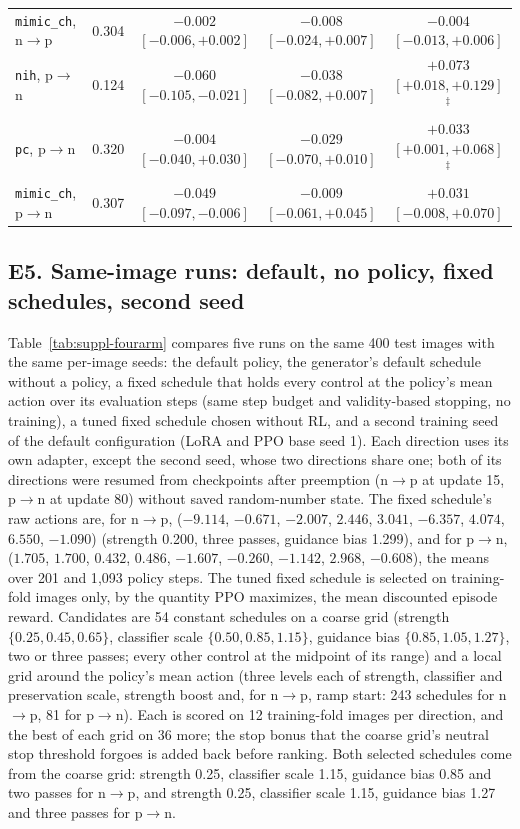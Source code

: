 \begin{table}[t]
\begin{tabular}{@{}lcccc@{}}
\texttt{mimic\_ch}, n$\to$p & 0.304 & $-0.002$ $[-0.006, +0.002]$ & $-0.008$ $[-0.024, +0.007]$ & $-0.004$ $[-0.013, +0.006]$ \\
\texttt{nih}, p$\to$n & 0.124 & $-0.060$ $[-0.105, -0.021]$ & $-0.038$ $[-0.082, +0.007]$ & $+0.073$ $[+0.018, +0.129]$$^{\ddagger}$ \\
\texttt{pc}, p$\to$n & 0.320 & $-0.004$ $[-0.040, +0.030]$ & $-0.029$ $[-0.070, +0.010]$ & $+0.033$ $[+0.001, +0.068]$$^{\ddagger}$ \\
\texttt{mimic\_ch}, p$\to$n & 0.307 & $-0.049$ $[-0.097, -0.006]$ & $-0.009$ $[-0.061, +0.045]$ & $+0.031$ $[-0.008, +0.070]$ \\
\bottomrule
\end{tabular}
\end{table}

\subsection*{E5. Same-image runs: default, no policy, fixed schedules, second seed}
\label{sec:suppl-fourarm}

Table~\ref{tab:suppl-fourarm} compares five runs on the same 400 test images with the same per-image seeds: the default policy, the generator's default schedule without a policy, a fixed schedule that holds every control at the policy's mean action over its evaluation steps (same step budget and validity-based stopping, no training), a tuned fixed schedule chosen without RL, and a second training seed of the default configuration (LoRA and PPO base seed 1). Each direction uses its own adapter, except the second seed, whose two directions share one; both of its directions were resumed from checkpoints after preemption (n$\to$p at update 15, p$\to$n at update 80) without saved random-number state. The fixed schedule's raw actions are, for n$\to$p, ($-9.114$, $-0.671$, $-2.007$, $2.446$, $3.041$, $-6.357$, $4.074$, $6.550$, $-1.090$) (strength 0.200, three passes, guidance bias 1.299), and for p$\to$n, ($1.705$, $1.700$, $0.432$, $0.486$, $-1.607$, $-0.260$, $-1.142$, $2.968$, $-0.608$), the means over 201 and 1{,}093 policy steps. The tuned fixed schedule is selected on training-fold images only, by the quantity PPO maximizes, the mean discounted episode reward. Candidates are 54 constant schedules on a coarse grid (strength $\{0.25, 0.45, 0.65\}$, classifier scale $\{0.50, 0.85, 1.15\}$, guidance bias $\{0.85, 1.05, 1.27\}$, two or three passes; every other control at the midpoint of its range) and a local grid around the policy's mean action (three levels each of strength, classifier and preservation scale, strength boost and, for n$\to$p, ramp start: 243 schedules for n$\to$p, 81 for p$\to$n). Each is scored on 12 training-fold images per direction, and the best of each grid on 36 more; the stop bonus that the coarse grid's neutral stop threshold forgoes is added back before ranking. Both selected schedules come from the coarse grid: strength 0.25, classifier scale 1.15, guidance bias 0.85 and two passes for n$\to$p, and strength 0.25, classifier scale 1.15, guidance bias 1.27 and three passes for p$\to$n.

